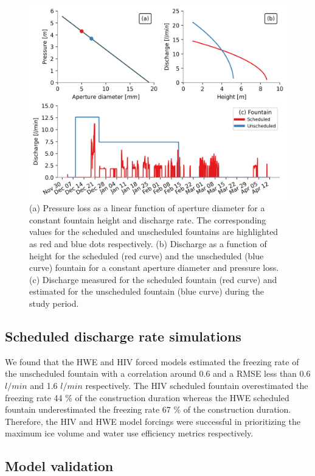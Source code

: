 \documentclass[tc, manuscript]{copernicus}
\begin{document}
\begin{figure}[t]
\includegraphics[width=12cm]{Figures/fountains.png}

\caption{ (a) Pressure loss as a linear function of aperture diameter for a constant fountain height and
  discharge rate. The corresponding values for the scheduled and unscheduled fountains are highlighted as red
  and blue dots respectively. (b) Discharge as a function of height for the scheduled (red curve) and the
  unscheduled (blue curve) fountain for a constant aperture diameter and pressure loss. (c) Discharge measured
  for the scheduled fountain (red curve) and estimated for the unscheduled fountain (blue curve) during the
study period.}

\label{fig:fountains}
\end{figure}

\subsection{Scheduled discharge rate simulations}

We found that the HWE and HIV forced models estimated the freezing rate of the unscheduled fountain with a
correlation around 0.6 and a RMSE less than 0.6 $l/min$ and 1.6  $l/min$ respectively. The HIV scheduled
fountain overestimated the freezing rate 44 \% of the construction duration whereas the HWE scheduled fountain
underestimated the freezing rate 67 \% of the construction duration. Therefore, the HIV and HWE model forcings
were successful in prioritizing the maximum ice volume and water use efficiency metrics respectively.

\subsection{Model validation}
\end{document}
